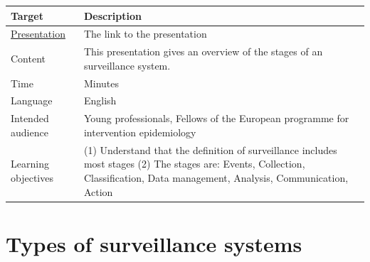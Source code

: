 \documentclass[
  letterpaper,
  DIV=11,
  numbers=noendperiod]{scrreprt}
\begin{document}
\begin{longtable}[]{@{}
  >{\raggedright\arraybackslash}p{}
  >{\raggedright\arraybackslash}p{}@{}}
\toprule\noalign{}
\begin{minipage}[b]{\linewidth}\raggedright
Target
\end{minipage} & \begin{minipage}[b]{\linewidth}\raggedright
Description
\end{minipage} \\
\midrule\noalign{}
\endhead
\bottomrule\noalign{}
\endlastfoot
\href{1_Presentations/presentation_stages.html}{Presentation} & The link
to the presentation \\
Content & This presentation gives an overview of the stages of an
surveillance system. \\
Time & 10 Minutes \\
Language & English \\
Intended audience & Young professionals, Fellows of the European
programme for intervention epidemiology \\
Learning objectives & (1) Understand that the definition of surveillance
includes most stages (2) The stages are: Events, Collection,
Classification, Data management, Analysis, Communication, Action \\
\end{longtable}

\section*{Types of surveillance
systems}\label{types-of-surveillance-systems}

\end{document}
